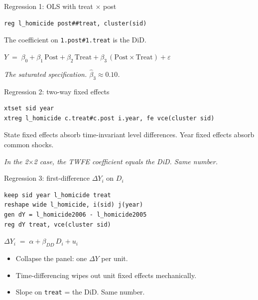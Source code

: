 \documentclass[aspectratio=169,11pt]{beamer}
\begin{document}
\begin{frame}[fragile]{Regression 1: OLS with treat $\times$ post}
\vspace{0.4em}
\begin{lstlisting}[language={[ANSI]C}]
reg l_homicide post##treat, cluster(sid)
\end{lstlisting}
\vspace{0.8em}
The coefficient on \texttt{1.post\#1.treat} is the DiD.
\vspace{0.6em}
\begin{center}
$Y \;=\; \beta_0 + \beta_1\,\text{Post} + \beta_2\,\text{Treat} + \beta_3\,(\text{Post}\times\text{Treat}) + \varepsilon$
\end{center}
\vspace{0.4em}
\begin{center}
\small\color{warmgray}\itshape The saturated specification. $\hat\beta_3 \approx 0.10$.
\end{center}
\end{frame}

\begin{frame}[fragile]{Regression 2: two-way fixed effects}
\vspace{0.4em}
\begin{lstlisting}[language={[ANSI]C}]
xtset sid year
xtreg l_homicide c.treat#c.post i.year, fe vce(cluster sid)
\end{lstlisting}
\vspace{0.8em}
State fixed effects absorb time-invariant level differences. \;Year fixed effects absorb common shocks.
\vspace{0.4em}
\begin{center}
\small\color{warmgray}\itshape In the 2$\times$2 case, the TWFE coefficient equals the DiD. \;Same number.
\end{center}
\end{frame}

\begin{frame}[fragile]{Regression 3: first-difference $\Delta Y_i$ on $D_i$}
\vspace{0.3em}
\begin{lstlisting}[language={[ANSI]C}]
keep sid year l_homicide treat
reshape wide l_homicide, i(sid) j(year)
gen dY = l_homicide2006 - l_homicide2005
reg dY treat, vce(cluster sid)
\end{lstlisting}
\vspace{0.6em}
\begin{center}
$\Delta Y_i \;=\; \alpha + \beta_{DD}\,D_i + u_i$
\end{center}
\vspace{0.4em}
\begin{itemize}\small
  \item Collapse the panel: one $\Delta Y$ per unit.
  \item Time-differencing wipes out unit fixed effects mechanically.
  \item Slope on \texttt{treat} = the DiD. \;Same number.
\end{itemize}
\end{frame}
\end{document}
